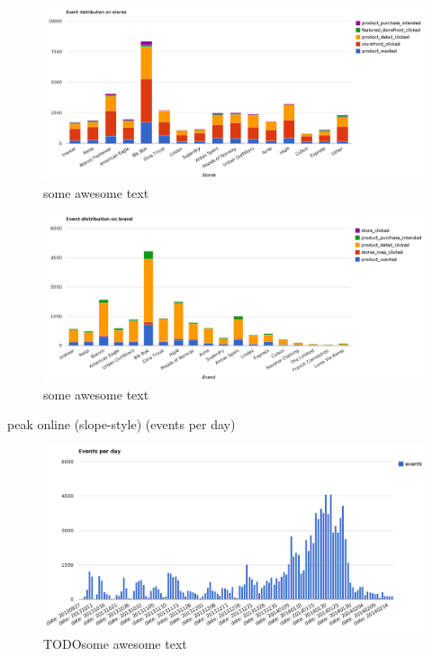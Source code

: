 \begin{figure}[H]
    \includegraphics[width=5in]{image/event_distr.png}
    \centering
    \caption[Distribution of events on storefronts]{some awesome text}
    \label{figure:ratingdistr}
\end{figure}

\begin{figure}[H]
    \includegraphics[width=5in]{image/brand_distr.png}
    \centering
    \caption[Distribution of events on brands]{some awesome text}
    \label{figure:ratingdistr}
\end{figure}

        peak online (slope-style) (events per day)

\begin{figure}[H]
    \includegraphics[width=5in]{image/events_per_day.png}
    \centering
    \caption[Distribution of events per day]{TODOsome awesome text}
    \label{figure:ratingdistr}
\end{figure}


